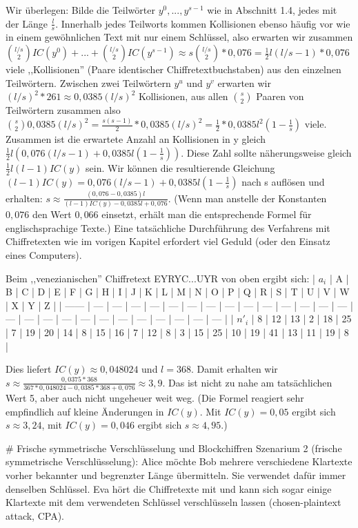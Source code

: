 \documentclass[a4paper]{article}
\begin{document}
\begin{multicols}{3}
Wir überlegen: Bilde die Teilwörter $y^0,...,y^{s-1}$ wie in Abschnitt 1.4, jedes mit der Länge $\frac{l}{s}$. Innerhalb jedes Teilworts kommen Kollisionen ebenso häufig vor wie in einem gewöhnlichen Text mit nur einem Schlüssel, also erwarten wir zusammen $\binom{l/s}{2} IC(y^0)+...+\binom{l/s}{2} IC(y^{s-1})\approx s\binom{l/s}{2}* 0,076 = \frac{1}{2}l(l/s-1)* 0,076$ viele ,,Kollisionen''  (Paare identischer Chiffretextbuchstaben) aus den einzelnen Teilwörtern. 
Zwischen zwei Teilwörtern $y^u$ und $y^v$ erwarten wir $(l/s)^2*261\approx 0,0385(l/s)^2$ Kollisionen, aus allen $\binom{s}{2}$ Paaren von Teilwörtern zusammen also $\binom{s}{2} 0,0385(l/s)^2 =\frac{s(s-1)}{2}* 0,0385(l/s)^2 =\frac{1}{2} *0,0385 l^2 (1-\frac{1}{s})$ viele. Zusammen ist die erwartete Anzahl an Kollisionen in y gleich $\frac{1}{2}l(0,076(l/s-1) + 0,0385 l(1-\frac{1}{s}))$.
Diese Zahl sollte näherungsweise gleich $\frac{1}{2}l(l-1)IC(y)$ sein. Wir können die resultierende Gleichung $(l-1)IC(y) = 0,076(l/s-1) + 0,0385 l(1-\frac{1}{s})$ nach s auflösen und erhalten: $s\approx \frac{(0,076-0,0385)l}{(l-1)IC(y)-0,0385l+0,076}$. (Wenn man anstelle der Konstanten $0,076$ den Wert $0,066$ einsetzt, erhält man die entsprechende Formel für englischsprachige Texte.)
Eine tatsächliche Durchführung des Verfahrens mit Chiffretexten wie im vorigen Kapitel erfordert viel Geduld (oder den Einsatz eines Computers).

Beim ,,venezianischen'' Chiffretext EYRYC...UYR von oben ergibt sich:
| $a_i$  | A   | B   | C   | D   | E   | F   | G   | H   | I   | J   | K   | L   | M   | N   | O   | P   | Q   | R   | S   | T   | U   | V   | W   | X   | Y   | Z   |
| ------ | --- | --- | --- | --- | --- | --- | --- | --- | --- | --- | --- | --- | --- | --- | --- | --- | --- | --- | --- | --- | --- | --- | --- | --- | --- | --- |
| $n′_i$ | 8   | 12  | 13  | 2   | 18  | 25  | 7   | 19  | 20  | 14  | 8   | 15  | 16  | 7   | 12  | 8   | 3   | 15  | 25  | 10  | 19  | 41  | 13  | 11  | 19  | 8   |

Dies liefert $IC(y)\approx 0,048024$ und $l=368$. Damit erhalten wir $s\approx\frac{0,0375*368}{367 *0,048024-0,0385 *368+0,076}\approx 3,9$.
Das ist nicht zu nahe am tatsächlichen Wert 5, aber auch nicht ungeheuer weit weg. (Die Formel reagiert sehr empfindlich auf kleine Änderungen in $IC(y)$. Mit $IC(y)=0,05$ ergibt sich $s\approx 3,24$, mit $IC(y)=0,046$ ergibt sich $s\approx 4,95$.)

# Frische symmetrische Verschlüsselung und Blockchiffren
Szenarium 2 (frische symmetrische Verschlüsselung): Alice möchte Bob mehrere verschiedene Klartexte vorher bekannter und begrenzter Länge übermitteln. Sie verwendet dafür immer denselben Schlüssel. Eva hört die Chiffretexte mit und kann sich sogar einige Klartexte mit dem verwendeten Schlüssel verschlüsseln lassen (chosen-plaintext attack, CPA).


\end{multicols}
\end{document}
